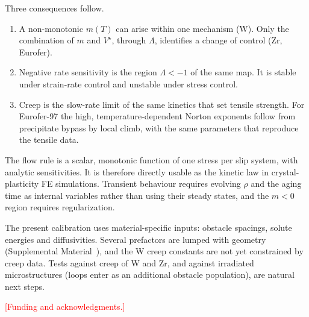 \documentclass[aps,prl,twocolumn,superscriptaddress,amsmath,amssymb,floatfix]{revtex4-2}
\newcommand{\todo}[1]{\textcolor{red}{[#1]}}
\begin{document}
Three consequences follow.
\begin{enumerate}
  \item A non-monotonic $m(T)$ can arise within one mechanism (W). Only the combination of $m$ and $V^\star$, through $\Lambda$, identifies a change of control (Zr, Eurofer).
  \item Negative rate sensitivity is the region $\Lambda<-1$ of the same map. It is stable under strain-rate control and unstable under stress control.
  \item Creep is the slow-rate limit of the same kinetics that set tensile strength. For Eurofer-97 the high, temperature-dependent Norton exponents follow from precipitate bypass by local climb, with the same parameters that reproduce the tensile data.
\end{enumerate}

The flow rule is a scalar, monotonic function of one stress per slip system, with analytic sensitivities. It is therefore directly usable as the kinetic law in crystal-plasticity FE simulations. Transient behaviour requires evolving $\rho$ and the aging time as internal variables rather than using their steady states, and the $m<0$ region requires regularization.

The present calibration uses material-specific inputs: obstacle spacings, solute energies and diffusivities. Several prefactors are lumped with geometry (Supplemental Material~\cite{SM}), and the W creep constants are not yet constrained by creep data. Tests against creep of W and Zr, and against irradiated microstructures (loops enter as an additional obstacle population), are natural next steps.

\begin{acknowledgments}
\todo{Funding and acknowledgments.}
\end{acknowledgments}
\end{document}
